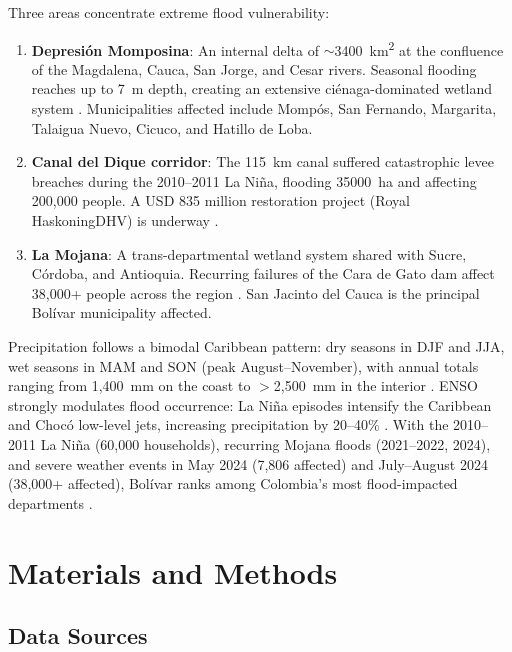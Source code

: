 \documentclass{article}
\begin{document}
Three areas concentrate extreme flood vulnerability:

\begin{enumerate}
    \item \textbf{Depresi\'on Momposina}: An internal delta of $\sim$\SI{3400}{\kilo\metre\squared} at the confluence of the Magdalena, Cauca, San Jorge, and Cesar rivers. Seasonal flooding reaches up to \SI{7}{\metre} depth, creating an extensive ci\'enaga-dominated wetland system \citep{Angarita2018}. Municipalities affected include Momp\'os, San Fernando, Margarita, Talaigua Nuevo, Cicuco, and Hatillo de Loba.

    \item \textbf{Canal del Dique corridor}: The \SI{115}{\kilo\metre} canal suffered catastrophic levee breaches during the 2010--2011 La Ni\~na, flooding \SI{35000}{\hectare} and affecting 200,000 people. A USD 835 million restoration project (Royal HaskoningDHV) is underway \citep{Mogollon2016}.

    \item \textbf{La Mojana}: A trans-departmental wetland system shared with Sucre, C\'ordoba, and Antioquia. Recurring failures of the Cara de Gato dam affect 38,000+ people across the region \citep{ACAPS2024}. San Jacinto del Cauca is the principal Bol\'ivar municipality affected.
\end{enumerate}

Precipitation follows a bimodal Caribbean pattern: dry seasons in DJF and JJA, wet seasons in MAM and SON (peak August--November), with annual totals ranging from 1,400~mm on the coast to $>$2,500~mm in the interior \citep{Urrea2019, Mesa2006}. ENSO strongly modulates flood occurrence: La Ni\~na episodes intensify the Caribbean and Choc\'o low-level jets, increasing precipitation by 20--40\% \citep{Poveda2001, PovedalMesa1997}. With the 2010--2011 La Ni\~na (60,000 households), recurring Mojana floods (2021--2022, 2024), and severe weather events in May 2024 (7,806 affected) and July--August 2024 (38,000+ affected), Bol\'ivar ranks among Colombia's most flood-impacted departments \citep{Hoyos2013}.

\section{Materials and Methods}
\label{sec:methods}

\subsection{Data Sources}
\end{document}
